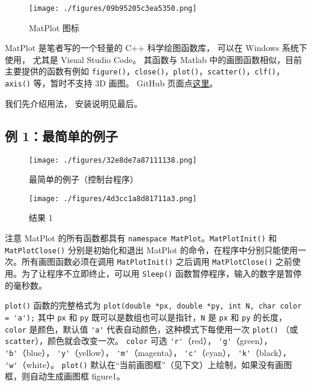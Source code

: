 
\begin{figure}[ht]
\centering
\texttt{[image: ./figures/09b95205c3ea5350.png]}
\caption{MatPlot 图标} \label{fig_MtPlot_1}
\end{figure}

MatPlot 是笔者写的一个轻量的 C++ 科学绘图函数库， 可以在 Windows 系统下使用， 尤其是 Visual Studio Code。 其函数与 Matlab 中的画图函数相似，目前主要提供的函数有例如 \verb|figure()|，\verb|close()|，\verb|plot()|，\verb|scatter()|，\verb|clf()|，\verb|axis()| 等，暂时不支持 3D 画图。 GitHub 页面点\href{https://github.com/MacroUniverse/MatPlot}{这里}。

我们先介绍用法， 安装说明见最后。

\subsection{例 1：最简单的例子}

\begin{figure}[ht]
\centering
\texttt{[image: ./figures/32e8de7a87111138.png]}
\caption{最简单的例子（控制台程序）} \label{fig_MtPlot_2}
\end{figure}

\begin{figure}[ht]
\centering
\texttt{[image: ./figures/4d3cc1a8d81711a3.png]}
\caption{结果 1} \label{fig_MtPlot_3}
\end{figure}

注意 MatPlot 的所有函数都具有 \verb|namespace MatPlot|。\verb|MatPlotInit()| 和 \verb|MatPlotClose()| 分别是初始化和退出 MatPlot 的命令，在程序中分别只能使用一次。所有画图函数必须在调用 \verb|MatPlotInit()| 之后调用 \verb|MatPlotClose()| 之前使用。为了让程序不立即终止，可以用 \verb|Sleep()| 函数暂停程序，输入的数字是暂停的毫秒数。

\verb|plot()| 函数的完整格式为
\verb|plot(double *px, double *py, int N, char color = 'a');|
其中 \verb|px| 和 \verb|py| 既可以是数组也可以是指针，\verb|N| 是 \verb|px| 和 \verb|py| 的长度，\verb|color| 是颜色，默认值 \verb|'a'| 代表自动颜色，这种模式下每使用一次 \verb|plot()| （或 \verb|scatter|），颜色就会改变一次。 \verb|color| 可选
\verb|'r'|（red），
\verb|'g'|（green），
\verb|'b'|（blue），
\verb|'y'|（yellow），
\verb|'m'|（magenta），
\verb|'c'|（cyan），
\verb|'k'|（black），
\verb|'w'|（white）。
\verb|plot()| 默认在“当前画图框”（见下文）上绘制，如果没有画图框，则自动生成画图框 figure1。

